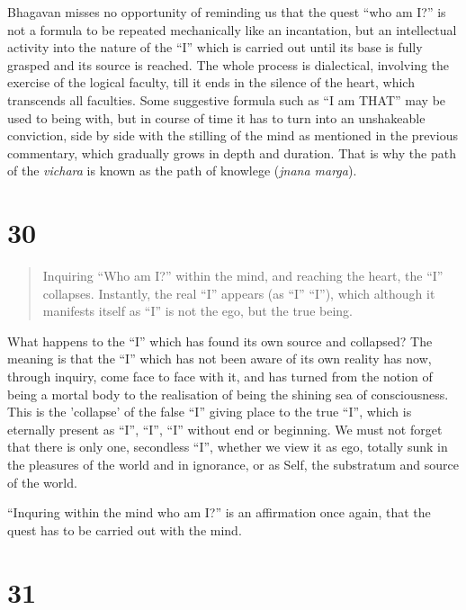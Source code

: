 \documentclass[12pt]{report}
\begin{document}

Bhagavan misses no opportunity of reminding us that the quest ``who am
I?'' is not a formula to be repeated mechanically like an incantation,
but an intellectual activity into the nature of the ``I'' which is
carried out until its base is fully grasped and its source is
reached. The whole process is dialectical, involving the exercise of
the logical faculty, till it ends in the silence of the heart, which
transcends all faculties. Some suggestive formula such as ``I am
THAT'' may be used to being with, but in course of time it has to turn
into an unshakeable conviction, side by side with the stilling of the
mind as mentioned in the previous commentary, which gradually grows in
depth and duration. That is why the path of the \emph{vichara} is
known as the path of knowlege (\emph{jnana marga}).

\section{30}

\begin{quote}
  Inquiring ``Who am I?'' within the mind, and reaching the heart, the
  ``I'' collapses. Instantly, the real ``I'' appears (as ``I'' ``I''),
  which although it manifests itself as ``I'' is not the ego, but the
  true being.
\end{quote}


What happens to the ``I'' which has found its own source and
collapsed? The meaning is that the ``I'' which has not been aware of
its own reality has now, through inquiry, come face to face with it,
and has turned from the notion of being a mortal body to the
realisation of being the shining sea of consciousness. This is the
'collapse' of the false ``I'' giving place to the true ``I'', which is
eternally present as ``I'', ``I'', ``I'' without end or beginning. We
must not forget that there is only one, secondless ``I'', whether we
view it as ego, totally sunk in the pleasures of the world and in
ignorance, or as Self, the substratum and source of the world.

``Inquring within the mind who am I?'' is an affirmation once again,
that the quest has to be carried out with the mind.

\section{31}
\end{document}

